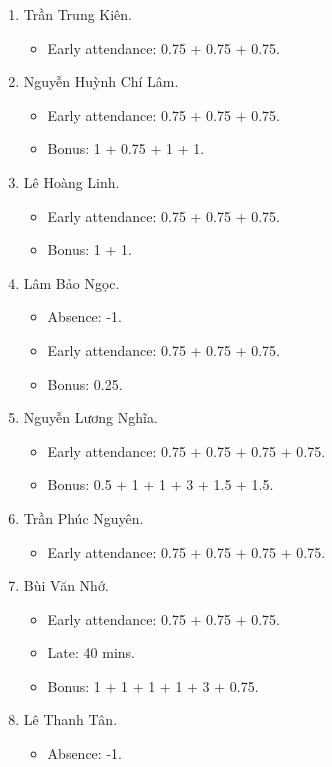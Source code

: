 \documentclass{article}
\begin{document}
\begin{enumerate}
\begin{itemize}
	\end{itemize}
	\item {\sc Trần Trung Kiên.}
	\begin{itemize}
		\item Early attendance: 0.75 + 0.75 + 0.75.
	\end{itemize}
	\item {\sc Nguyễn Huỳnh Chí Lâm.}
	\begin{itemize}
		\item Early attendance: 0.75 + 0.75 + 0.75.
		\item Bonus: 1 + 0.75 + 1 + 1.
	\end{itemize}
	\item {\sc Lê Hoàng Linh.}
	\begin{itemize}
		\item Early attendance: 0.75 + 0.75 + 0.75.
		\item Bonus: 1 + 1.
	\end{itemize}
	\item {\sc Lâm Bảo Ngọc.}
	\begin{itemize}
		\item Absence: -1.
		\item Early attendance: 0.75 + 0.75 + 0.75.
		\item Bonus: 0.25.
	\end{itemize}
	\item {\sc Nguyễn Lương Nghĩa.}
	\begin{itemize}
		\item Early attendance: 0.75 + 0.75 + 0.75 + 0.75.
		\item Bonus: 0.5 + 1 + 1 + 3 + 1.5 + 1.5.
	\end{itemize}
	\item {\sc Trần Phúc Nguyên.}
	\begin{itemize}
		\item Early attendance: 0.75 + 0.75 + 0.75 + 0.75.
	\end{itemize}
	\item {\sc Bùi Văn Nhớ}.
	\begin{itemize}
		\item Early attendance: 0.75 + 0.75 + 0.75.
		\item Late: 40 mins.
		\item Bonus: 1 + 1 + 1 + 1 + 3 + 0.75.	
	\end{itemize}
	\item {\sc Lê Thanh Tân.}
	\begin{itemize}
		\item Absence: -1.

\end{itemize}
\end{enumerate}
\end{document}
